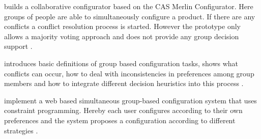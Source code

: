 \begin{description}[style=unboxed, leftmargin=0cm, font=\normalfont]
    \item[\citeauthor{raabKollaborativeProduktkonfigurationEchtzeit2019}] builds a collaborative configurator based on the CAS Merlin Configurator. Here groups of people are able to simultaneously configure a product. If there are any conflicts a conflict resolution process is started. However the prototype only allows a majority voting approach and does not provide any group decision support \cite{raabKollaborativeProduktkonfigurationEchtzeit2019}.

    \item[\citeauthor{felferningGroupBasedConfiguration2016}] introduces basic definitions of group based configuration tasks, shows what conflicts can occur, how to deal with inconsistencies in preferences among group members and how to integrate different decision heuristics into this process \cite{felferningGroupBasedConfiguration2016}.

    \item[\citeauthor{velasquez-guevaraMultiSPLOTSupportingMultiuser2018}] implement a web based simultaneous group-based configuration system that uses constraint programming. Hereby each user configures according to their own preferences and the system proposes a configuration according to different strategies \cite{velasquez-guevaraMultiSPLOTSupportingMultiuser2018}.  
\end{description}

